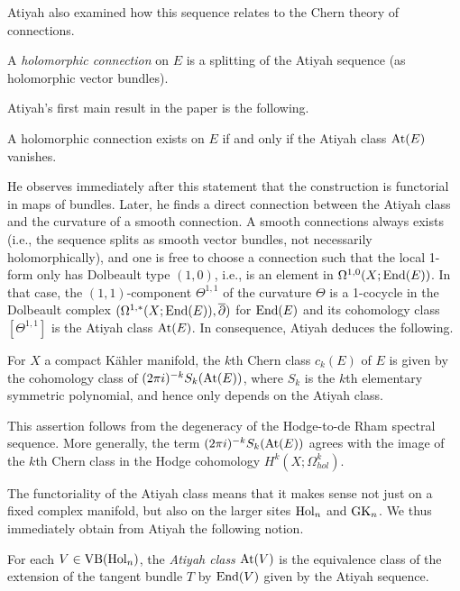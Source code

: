 Atiyah also examined how this sequence relates to the Chern theory of connections.

\begin{prop} 
A {\em holomorphic connection} on $E$ is a splitting of the Atiyah sequence (as holomorphic vector bundles).
\end{prop}

Atiyah's first main result in the paper is the following.

\begin{prop}
A holomorphic connection exists on $E$ if and only if the Atiyah class ${\rm At}(E)$ vanishes.
\end{prop}

He observes immediately after this statement that the construction is
functorial in maps of bundles. Later, he finds a direct connection
between the Atiyah class and the curvature of a smooth connection. A
smooth connections always exists (i.e., the sequence splits as smooth
vector bundles, not necessarily holomorphically), and one is free to
choose a connection such that the local 1-form only has
Dolbeault type $(1,0)$, i.e., is an element in $\Omega^{1,0}(X; {\rm End}(E))$. In that case, the $(1,1)$-component
$\Theta^{1,1}$ of the curvature $\Theta$ is a 1-cocycle in the
Dolbeault complex $(\Omega^{1,*}(X ; {\rm End}(E)), \overline{\partial})$ for ${\rm End}(E)$ and its cohomology class $[\Theta^{1,1}]$ is the Atiyah class ${\rm At}(E)$. In consequence, Atiyah deduces the following.

\begin{prop}
For $X$ a compact K\"ahler manifold, the $k$th Chern class $c_k(E)$ of $E$ is given by the cohomology class of $(2\pi i)^{-k} S_k({\rm At}(E))$, 
where $S_k$ is the $k$th elementary symmetric polynomial, and hence only depends on the Atiyah class.
\end{prop}

This assertion follows from the degeneracy of the Hodge-to-de Rham
spectral sequence. More generally, the term $(2\pi i)^{-k}
S_k({\rm At}(E))$ agrees with the image of the $k$th Chern class in the
Hodge cohomology $H^k(X ; \Omega^k_{hol})$.

The functoriality of the Atiyah class means that it makes sense not just on a fixed complex manifold, but also on the larger sites ${\rm Hol}_n$ and ${\rm GK}_n$. 
We thus immediately obtain from Atiyah the following notion.

\begin{dfn}
For each $V \in {\rm VB}({\rm Hol}_n)$, the {\em Atiyah class} ${\rm At}(V)$ is the equivalence class of the extension of the tangent bundle $T$ by ${\rm End}(V)$ given by the Atiyah sequence.
\end{dfn}


